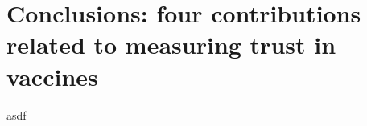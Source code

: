 
\chapter{Conclusions: four contributions related to measuring trust in vaccines} \label{chap:conclusions}

asdf